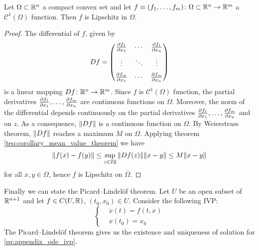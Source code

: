 \begin{theorem} \label{teo:c1_function_implies_lipschitz} Let $\Omega \subset
	\mathbb{R}^n$ a compact convex set and let $f \equiv (f_1, \ldots, f_m) \colon
	\Omega \subset \mathbb{R}^n \to \mathbb{R}^m$ a $\mathcal{C}^1(\Omega)$ function. Then
	$f$ is Lipschitz in $\Omega$.
\end{theorem}
\begin{proof}
	The differential of $f$, given by
	\begin{equation*}
		D f = 
		\begin{pmatrix}
			\pdv{f_1}{x_1} & \cdots & \pdv{f_1}{x_n} \\[6pt]
			\vdots & \ddots & \vdots \\[6pt]
			\pdv{f_m}{x_1} & \cdots & \pdv{f_m}{x_n} \\
		\end{pmatrix}
	\end{equation*}
	is a linear mapping $D f \colon \mathbb{R}^n \rightarrow \mathbb{R}^m$. Since $f$ is
	$\mathcal{C}^1(\Omega)$ function, the partial derivatives $\pdv{f_1}{x_1},
	\ldots, \pdv{f_m}{x_n}$ are continuous functions on $\Omega$. Moreover, the
	norm of the differential depends continuously on the partial derivatives
	$\pdv{f_1}{x_1}, \ldots, \pdv{f_m}{x_n}$ and on $z$. As a consequence,
	$\norm{D f}$ is a continuous function on $\Omega$. By Weierstrass theorem,
	$\norm{D f}$ reaches a maximum $M$ on $\Omega$. Applying theorem
	\ref{teo:corollary_mean_value_theorem} we have 
	\begin{equation*}
		\norm{f(x) - f(y)} \leq \sup_{z \in 
		\overline{xy}} \norm{D f(z)} \norm{x - y} \leq
		M \norm{x - y}
	\end{equation*}
	for all $x, y \in \Omega$, hence $f$ is Lipschitz on
	$\overline{\Omega}$.
\end{proof}

Finally we can state the Picard--Lindelöf theorem. Let $U$ be an open subset of
$\mathbb{R}^{n+1}$ and let $f \in C(U, \mathbb{R})$, $(t_0, x_0) \in U$. Consider the
following IVP:
\begin{equation} \label{eq:appendix_ode_ivp}
	\left\{
	\begin{aligned}
		&\dot{x}(t) = f(t, x) \\
		&x(t_0) = x_0
	\end{aligned}
	\right.
\end{equation}
The Picard--Lindelöf theorem gives us the existence and uniqueness of solution
for \eqref{eq:appendix_ode_ivp}.

